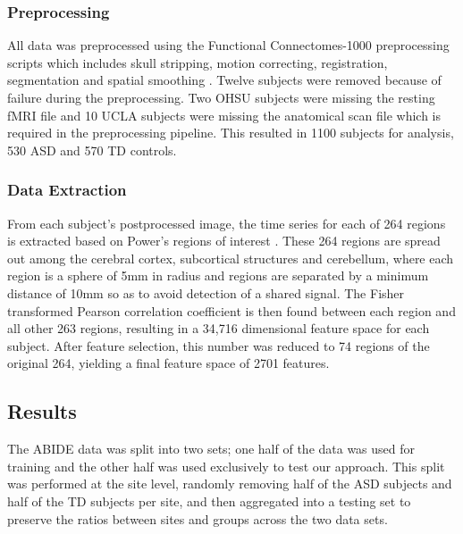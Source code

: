 \documentclass{llncs}
\begin{document}
\subsubsection{Preprocessing}
All data was preprocessed using the Functional Connectomes-1000 preprocessing scripts which includes skull stripping, motion correcting, registration, segmentation and spatial smoothing \cite{fcon}.
Twelve subjects were removed because of failure during the preprocessing.  Two OHSU subjects were missing the resting fMRI file and 10 UCLA subjects were missing the anatomical scan file which is required in the preprocessing pipeline. This resulted in 1100 subjects for analysis, 530 ASD and 570 TD controls.
\subsubsection{Data Extraction}
From each subject's postprocessed image, the time series for each of 264 regions is extracted based on Power's regions of interest \cite{Powers}. These 264 regions are spread out among the cerebral cortex, subcortical structures and cerebellum, where each region is a sphere of 5mm in radius and regions are separated by a minimum distance of 10mm so as to avoid detection of a shared signal. The Fisher transformed Pearson correlation coefficient is then found between each region and all other 263 regions, resulting in a 34,716 dimensional feature space for each subject. After feature selection, this number was reduced to 74 regions of the original 264, yielding a final feature space of 2701 features.
\subsection{Results}
The ABIDE data was split into two sets; one half of the data was used for training and the other half was used exclusively to test our approach.  This split was performed at the site level, randomly removing half of the ASD subjects and half of the TD subjects per site, and then aggregated into a testing set to preserve the ratios between sites and groups across the two data sets.
\end{document}
